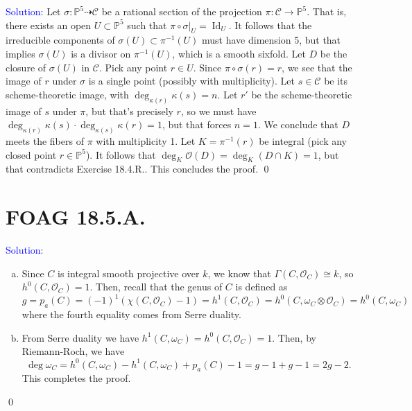 \documentclass[11pt]{article}
\newcommand{\PP}{\mathbb{P}}
\newcommand{\cC}{\mathcal{C}}
\newcommand{\cO}{\mathcal{O}}
\newcommand{\Id}{\operatorname{Id}}
\newenvironment{solution}{\begin{trivlist}\item[]{\textcolor{blue}{Solution:}}}{\qed \end{trivlist}}
\begin{document}
\begin{solution}
    Let $\sigma: \PP^5 \dashrightarrow \cC$ be a rational section of the projection $\pi: \cC \rightarrow \PP^5$. That is, there exists an open $U \subset \PP^5$ such that $\pi \circ \sigma|_U = \Id_U$. It follows that the irreducible components of $\sigma(U) \subset \pi^{-1}(U)$ must have dimension 5, but that implies $\sigma(U)$ is a divisor on $\pi^{-1}(U)$, which is a smooth sixfold. Let $D$ be the closure of $\sigma(U)$ in $\cC$. Pick any point $r \in U$. Since $\pi \circ \sigma(r) = r$, we see that the image of $r$ under $\sigma$ is a single point (possibly with multiplicity). Let $s \in \cC$ be its scheme-theoretic image, with $\deg_{\kappa(r)} \kappa(s) = n$. Let $r'$ be the scheme-theoretic image of $s$ under $\pi$, but that's precisely $r$, so we must have $\deg_{\kappa(r)} \kappa(s) \cdot \deg_{\kappa(s)} \kappa(r) = 1$, but that forces $n = 1$. We conclude that $D$ meets the fibers of $\pi$ with multiplicity 1. Let $K = \pi^{-1}(r)$ be integral (pick any closed point $r \in \PP^5$). It follows that $\deg_K \cO(D) = \deg_K (D \cap K) = 1$, but that contradicts Exercise 18.4.R.. This concludes the proof. 
\end{solution}

\newpage

\section*{FOAG 18.5.A.}

\begin{solution}
\begin{enumerate}[(a)]
    \item Since $C$ is integral smooth projective over $k$, we know that $\Gamma(C, \cO_C) \cong k$, so $h^0(C, \cO_C) = 1$. Then, recall that the genus of $C$ is defined as 
    \[
        g = p_a(C)
        = (-1)^1 (\chi(C, \cO_C) - 1)
        = h^1(C, \cO_C)
        = h^0(C, \omega_C \otimes \cO_C)
        = h^0(C, \omega_C)
    \]  
    where the fourth equality comes from Serre duality.
    
    \item From Serre duality we have $h^1(C, \omega_C) = h^0(C, \cO_C) = 1$. Then, by Riemann-Roch, we have 
    \[
        \deg \omega_C 
        = h^0(C, \omega_C) - h^1(C, \omega_C) + p_a(C) - 1 
        = g - 1 + g - 1 
        = 2g - 2.
    \]
    This completes the proof. 
\end{enumerate}
\end{solution}
\end{document}
